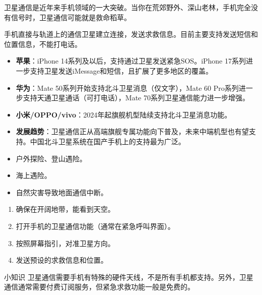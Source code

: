 


卫星通信是近年来手机领域的一大突破。当你在荒郊野外、深山老林，手机完全没有信号时，卫星通信可能就是救命稻草。


手机直接与轨道上的通信卫星建立连接，发送求救信息。目前主要支持发送短信和位置信息，不能打电话。


\begin{itemize}
  \item \textbf{苹果}：iPhone 14系列及以后，支持通过卫星发送紧急SOS。iPhone 17系列进一步支持卫星发送iMessage和短信，且扩展了更多地区的覆盖。
  \item \textbf{华为}：Mate 50系列开始支持北斗卫星消息（仅文字），Mate 60 Pro系列进一步支持天通卫星通话（可打电话），Mate 70系列卫星通信能力进一步增强。
  \item \textbf{小米/OPPO/vivo}：2024年起旗舰机型陆续支持北斗卫星消息功能。
  \item \textbf{发展趋势}：卫星通信正从高端旗舰专属功能向下普及，未来中端机型也有望支持。中国北斗卫星系统在国产手机上的支持最为广泛。
\end{itemize}


\begin{itemize}
  \item 户外探险、登山遇险。
  \item 海上遇险。
  \item 自然灾害导致地面通信中断。
\end{itemize}


\begin{enumerate}
  \item 确保在开阔地带，能看到天空。
  \item 打开手机的卫星通信功能（通常在紧急呼叫界面）。
  \item 按照屏幕指引，对准卫星方向。
  \item 发送预设的求救信息和位置。
\end{enumerate}

\begin{tcbinfo}{小知识}
卫星通信需要手机有特殊的硬件天线，不是所有手机都支持。另外，卫星通信通常需要付费订阅服务，但紧急求救功能一般是免费的。

\end{tcbinfo}

